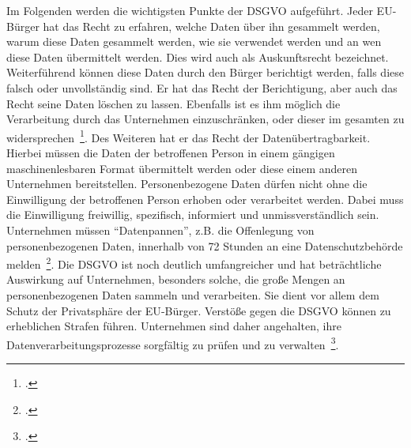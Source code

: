 Im Folgenden werden die wichtigsten Punkte der \ac{DSGVO} aufgeführt. Jeder \ac{EU}-Bürger hat das Recht zu erfahren, welche Daten über ihn gesammelt werden, warum diese Daten gesammelt werden, wie sie verwendet werden und an wen diese Daten übermittelt werden. 
Dies wird auch als Auskunftsrecht bezeichnet. Weiterführend können diese Daten durch den Bürger
berichtigt werden, falls diese falsch oder unvollständig sind. Er hat das Recht der Berichtigung, aber auch das Recht seine Daten löschen zu lassen. Ebenfalls ist es ihm möglich die 
Verarbeitung durch das Unternehmen einzuschränken, oder dieser im gesamten zu widersprechen~\footcite[\vglf][]{Voigt.2018}. Des Weiteren hat er das Recht der Datenübertragbarkeit. Hierbei müssen die Daten der
betroffenen Person in einem gängigen maschinenlesbaren Format übermittelt werden oder diese einem anderen Unternehmen bereitstellen.
Personenbezogene Daten dürfen nicht ohne die Einwilligung der betroffenen Person erhoben oder verarbeitet werden. Dabei muss die Einwilligung freiwillig, spezifisch, informiert und
unmissverständlich sein.
Unternehmen müssen \enquote{Datenpannen}, z.B. die Offenlegung von personenbezogenen Daten, innerhalb von 72 Stunden an eine Datenschutzbehörde melden~\footcite[\vglf][]{Voigt.2018}.
Die \ac{DSGVO} ist noch deutlich umfangreicher und hat beträchtliche Auswirkung auf Unternehmen, besonders solche, die große Mengen an personenbezogenen Daten sammeln und verarbeiten.
Sie dient vor allem dem Schutz der Privatsphäre der \ac{EU}-Bürger.
Verstöße gegen die DSGVO können zu erheblichen Strafen führen. Unternehmen sind daher angehalten, ihre Datenverarbeitungsprozesse sorgfältig zu prüfen und zu verwalten~\footcite[\vglf][]{Voigt.2018}.

